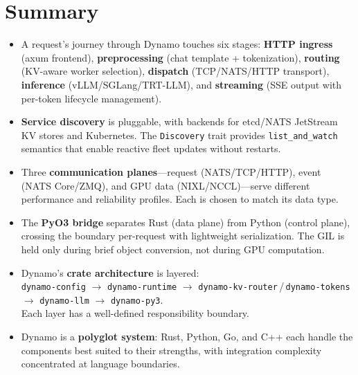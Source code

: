 \section{Summary}
\label{sec:architecture:summary}

\begin{itemize}
  \item A request's journey through Dynamo touches six stages: \textbf{HTTP ingress} (axum frontend), \textbf{preprocessing} (chat template + tokenization), \textbf{routing} (KV-aware worker selection), \textbf{dispatch} (TCP/NATS/HTTP transport), \textbf{inference} (vLLM/SGLang/TRT-LLM), and \textbf{streaming} (SSE output with per-token lifecycle management).

  \item \textbf{Service discovery} is pluggable, with backends for etcd/NATS JetStream KV stores and Kubernetes. The \texttt{Discovery} trait provides \texttt{list\_and\_watch} semantics that enable reactive fleet updates without restarts.

  \item Three \textbf{communication planes}---request (NATS/TCP/HTTP), event (NATS Core/ZMQ), and GPU data (NIXL/NCCL)---serve different performance and reliability profiles. Each is chosen to match its data type.

  \item The \textbf{PyO3 bridge} separates Rust (data plane) from Python (control plane), crossing the boundary per-request with lightweight serialization. The GIL is held only during brief object conversion, not during GPU computation.

  \item Dynamo's \textbf{crate architecture} is layered:\\ \texttt{dynamo-config} $\rightarrow$ \texttt{dynamo-runtime} $\rightarrow$ \texttt{dynamo-kv-router}\,/\,\texttt{dynamo-tokens} $\rightarrow$ \texttt{dynamo-llm} $\rightarrow$ \texttt{dynamo-py3}.\\ Each layer has a well-defined responsibility boundary.

  \item Dynamo is a \textbf{polyglot system}: Rust, Python, Go, and C++ each handle the components best suited to their strengths, with integration complexity concentrated at language boundaries.
\end{itemize}

